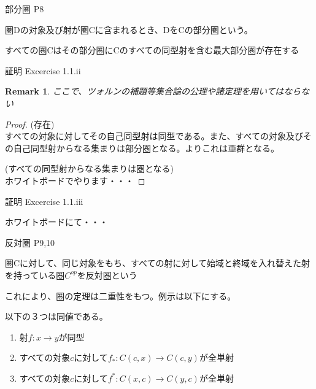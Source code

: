 \documentclass[unicode,12pt,aspectratio=169]{beamer}
\newtheorem*{remark}{Remark}
\begin{document}
\begin{frame}{部分圏 P8}
    \begin{tcolorbox}
        \begin{definition}
            圏Dの対象及び射が圏Cに含まれるとき、DをCの部分圏という。
        \end{definition}
        \begin{theorem}
            すべての圏Cはその部分圏にCのすべての同型射を含む最大部分圏が存在する
        \end{theorem}
    \end{tcolorbox}
\end{frame}
\begin{frame}{証明 Excercise 1.1.ii}
    \begin{tcolorbox}
        \begin{remark}
            ここで、ツォルンの補題等集合論の公理や諸定理を用いてはならない
        \end{remark}
        \begin{proof}
            (存在)\\
            すべての対象に対してその自己同型射は同型である。また、すべての対象及びその自己同型射からなる集まりは部分圏となる。よりこれは亜群となる。

            (すべての同型射からなる集まりは圏となる)\\
            ホワイトボードでやります・・・
        \end{proof}
    \end{tcolorbox}
\end{frame}
\begin{frame}{証明 Excercise 1.1.iii}
    \begin{tcolorbox}
        ホワイトボードにて・・・
    \end{tcolorbox}
\end{frame}
\begin{frame}{反対圏 P9,10}
    \begin{tcolorbox}
        \begin{definition}
            圏Cに対して、同じ対象をもち、すべての射に対して始域と終域を入れ替えた射を持っている圏$C^{op}$を反対圏という
        \end{definition}
        これにより、圏の定理は二重性をもつ。例示は以下にする。
        \begin{theorem}
            以下の３つは同値である。
            \begin{enumerate}
                \item 射$f:x \rightarrow y$が同型
                \item すべての対象$c$に対して$f_*:C(c,x) \rightarrow C(c,y)$が全単射
                \item すべての対象$c$に対して$f^*:C(x,c) \rightarrow C(y,c)$が全単射
            \end{enumerate}
        \end{theorem}
    \end{tcolorbox}
\end{frame}
\begin{frame}{}
    \begin{tcolorbox}
    \end{tcolorbox}
\end{frame}
\end{document}
